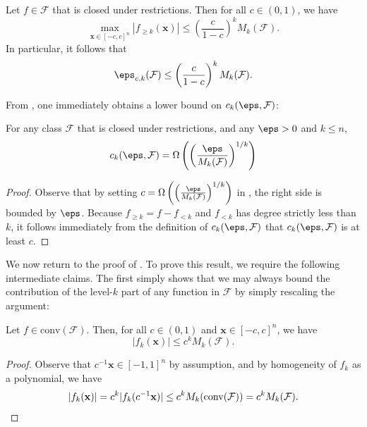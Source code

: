 \begin{THM}
\label{thm:main}
        Let $f\in \mathcal{F}$ that is closed under restrictions. Then for all $c \in (0,1)$, we have     \begin{equation*}
        \max_{\mathbf{x} \in [-c , c]^n } \left \vert f_{\geq k} (\mathbf{x}) \right\vert \leq \left( \frac{c}{1 - c} \right)^k M_k(\mathcal{F}).
    \end{equation*}
    In particular, it follows that
    \begin{equation*}
        \eps_{c,k}(\mathcal{F})\leq \left( \frac{c}{1 - c} \right)^k M_k(\mathcal{F}).
    \end{equation*}
\end{THM}
From , one immediately obtains a lower bound on $c_k(\eps,\mathcal{F})$:
\begin{corollary}
\label{cor:ckbound}
For any class $\mathcal{F}$ that is closed under restrictions, and any $\eps>0$ and $k\leq n$, 
\begin{equation*}
    c_k(\eps,\mathcal{F}) = \Omega\left(\left(\frac{\eps}{M_k(\mathcal{F})}\right)^{1/k}\right)
\end{equation*}
\end{corollary}
\begin{proof}
Observe that by setting $c=\Omega\left(\left(\frac{\eps}{M_k(\mathcal{F})}\right)^{1/k}\right)$ in , the right side is bounded by $\eps$. Because $f_{\geq k}=f-f_{<k}$ and $f_{<k}$ has degree strictly less than $k$, it follows immediately from the definition of $c_k(\eps,\mathcal{F})$ that $c_k(\eps,\mathcal{F})$ is at least $c$.
\end{proof}
    We now return to the proof of . To prove this result, we require the following intermediate claims. The first simply shows that we may always bound the contribution of the level-$k$ part of any function in $\mathcal{F}$ by simply rescaling the argument: 
    \begin{lemma} 
    \label{lem:mult}
        Let $f \in \mathrm{conv}(\mathcal{F})$. 
        Then, for all $c\in ( 0,1 )$ and $\mathbf{x} \in [-c , c  ]^n$, we have 
        \begin{equation*}
            \vert f_k(\mathbf{x})\vert \leq c^k M_k(\mathcal{F}). 
        \end{equation*}
    \end{lemma}
    
    \begin{proof}
    Observe that $c^{-1}\mathbf{x}\in [-1,1]^n$ by assumption, and by homogeneity of $f_{k}$ as a polynomial, we have
    \begin{equation*}
        \vert f_k(\mathbf{x})\vert=c^k \vert f_k(c^{-1}\mathbf{x})\vert\leq c^k M_k(\mathrm{conv}(\mathcal{F}))= c^k M_k(\mathcal{F}). \qedhere
    \end{equation*}
    \end{proof}

